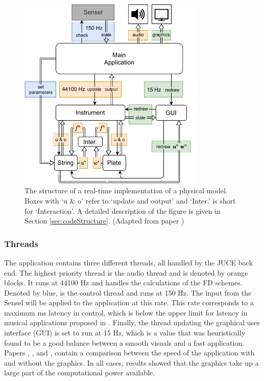 \begin{figure}[h]
    \centering
    \includegraphics[width=0.8\textwidth]{figures/realtime/flowchart.pdf}
    \caption{The structure of a real-time implementation of a physical model. Boxes with `u \& o' refer to `update and output' and `Inter.' is short for `Interaction'. A detailed description of the figure is given in Section \ref{sec:codeStructure}. (Adapted from paper \citeP[A])\label{fig:codeStructure}}
\end{figure}

\subsubsection{Threads}
The application contains three different threads, all handled by the JUCE back end. The highest priority thread is the audio thread and is denoted by orange blocks. It runs at 44100 Hz and handles the calculations of the FD schemes. Denoted by blue, is the control thread and runs at 150 Hz. The input from the Sensel will be applied to the application at this rate. This rate corresponds to a maximum  ms latency in control, which is below the upper limit for latency in musical applications proposed in \cite{Wessel2002}. Finally, the thread updating the graphical user interface (GUI) is set to run at 15 Hz, which is a value that was heuristically found to be a good balance between a smooth visuals and a fast application. %
Papers \citeP[A], \citeP[C], and \citeP[H], contain a comparison between the speed of the application with and without the graphics. In all cases, results showed that the graphics take up a large part of the computational power available.


